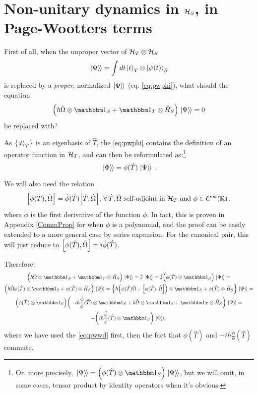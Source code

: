 \section{Non-unitary dynamics in $\mathcal{H}_S$, in Page-Wootters terms}

First of all,
when the unproper vector of $\mathcal{H}_T \otimes \mathcal{H}_S$
\begin{equation}
  \left.\left| \Psi \right\rangle\hspace{-0.115em}\right\rangle = \int dt \ket{t}_{T} \otimes \ket{\psi(t)}_{S}
\end{equation}
is replaced by a \emph{proper}, normalized $\left.\left| \Phi \right\rangle\hspace{-0.115em}\right\rangle$ (eq. \ref{eq:pwphi}),
what should the equation
\begin{equation}\label{eq:pwwd}
  \qty(\hbar\hat{\Omega} \ox \idop_S + \idop_T \ox \hat{H}_S)\dket{\Psi} = 0
\end{equation}
be replaced with?

As $\left\{\ket{t}_T\right\}$ is an eigenbasis of $\hat{T}$, the \eqref{eq:pwphi}
contains the definition of an operator function in $\mathcal{H}_T$,
and can then be reformulated as:\footnote{
  Or, more precisely, $\dket{\Psi} = \qty( \phi(\hat{T}) \ox \idop_S ) \dket{\Psi}$,
  but we will omit, in some cases,
  tensor product by identity operators
  when it's obvious.
}
\begin{equation}
  \left.\left| \Phi \right\rangle\hspace{-0.115em}\right\rangle = \phi(\hat{T})\left.\left| \Psi \right\rangle\hspace{-0.115em}\right\rangle \, \text{.}
\end{equation}

We will also need the relation
\begin{equation}
  \comm{\phi(\hat{T})}{\hat{\Omega}} = \dot{\phi}(\hat{T}) \comm{\hat{T}}{\hat{\Omega}}, \,
    \forall \, \hat{T}, \hat{\Omega} \text{ self-adjoint in } \hilb{H}_T \text{ and } \phi \in C^{\infty}(\mathbb{R}) \, \text{,} 
\end{equation}
where $\dot{\phi}$ is the first derivative of the function $\phi$.
In fact, this is proven in Appendix \ref{CommProp} for when $\phi$ is a polynomial,
and the proof can be easily extended to a more general case by series expansion.
For the canonical pair, this will just reduce to $\comm{\phi(\hat{T})}{\hat{\Omega}} = i \dot{\phi} (\hat{T})$.

Therefore:
\begin{multline}\label{eq:complex_dynam_deriv}
  \qty( \hbar\hat{\Omega} \ox \idop_S + \idop_T \ox \hat{H}_S ) \dket{\Phi} =
  \hat{\mathbb{J}}\dket{\Phi} =
  \hat{\mathbb{J}} \qty( \phi(\hat{T}) \ox \idop_S) \dket{\Psi} =
  \\
  \qty( \hbar\hat{\Omega}\phi(\hat{T}) \ox \idop_S + \phi(\hat{T}) \ox \hat{H}_S )\dket{\Psi} =
  \qty{
    \hbar\qty( \phi(\hat{T})\hat{\Omega} - \comm{\phi(\hat{T})}{\hat{\Omega}} ) \ox \idop_S +
    \phi(\hat{T}) \ox \hat{H}_S
  }\dket{\Psi} =
  \\
  \qty(
    \phi(\hat{T}) \ox \idop_S
  )
  \qty(
    - i \hbar \frac{\dot{\phi}}{\phi} (\hat{T}) \ox \idop_S
    + \hbar\hat{\Omega} \ox \idop_S
    + \idop_T \ox \hat{H}_S
  ) \dket{\Psi} =
  \\
  - \qty( i \hbar \frac{\dot{\phi}}{\phi} (\hat{T}) \ox \idop_S ) \dket{\Phi}
  \text{,}
\end{multline}
where we have used the \eqref{eq:pwwd} first, then the fact that $\phi(\hat{T})$ 
and $-i\hbar\frac{\dot{\phi}}{\phi}(\hat{T})$ commute.

